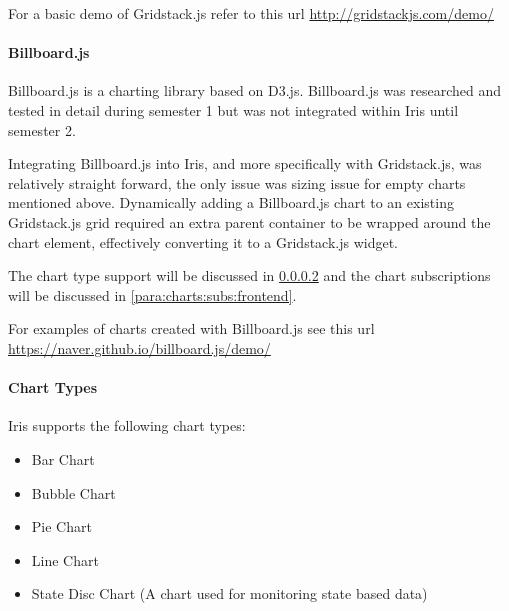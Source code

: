 \documentclass[12pt,a4paper,titlepage]{report}
\begin{document}


For a basic demo of Gridstack.js refer to this url \url{http://gridstackjs.com/demo/}

\paragraph{Billboard.js}

Billboard.js is a charting library based on D3.js.  Billboard.js was researched and tested in detail during semester 1 but was not integrated within Iris until semester 2.

Integrating Billboard.js into Iris, and more specifically with Gridstack.js, was relatively straight forward, the only issue was sizing issue for empty charts mentioned above.  
Dynamically adding a Billboard.js chart to an existing Gridstack.js grid required an extra parent container to be wrapped around the chart element, effectively converting it to a Gridstack.js widget.


The chart type support will be discussed in \cref{para:charts:fontend} and the chart subscriptions will be discussed in \cref{para:charts:subs:frontend}.

For examples of charts created with Billboard.js see this url \url{https://naver.github.io/billboard.js/demo/}

\paragraph{Chart Types}

\label{para:charts:fontend}
Iris supports the following chart types:
\begin{itemize}
    \item Bar Chart
    \item Bubble Chart
    \item Pie Chart
    \item Line Chart
    \item State Disc Chart (A chart used for monitoring state based data)
\end{itemize}
\end{document}
